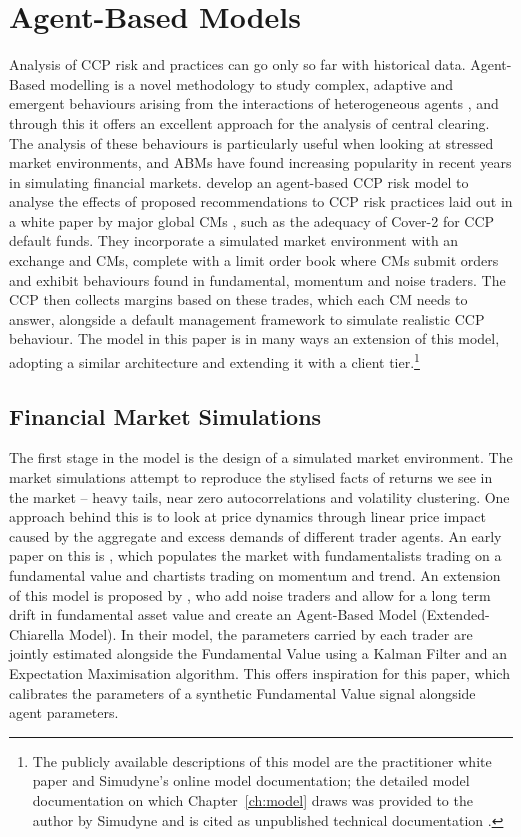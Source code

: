 \section{Agent-Based Models}

Analysis of CCP risk and practices can go only so far with historical data. Agent-Based modelling is a novel methodology to study complex, adaptive and emergent behaviours arising from the interactions of heterogeneous agents \citep{axtell_farmer_2025}, and through this it offers an excellent approach for the analysis of central clearing. The analysis of these behaviours is particularly useful when looking at stressed market environments, and ABMs have found increasing popularity in recent years in simulating financial markets. \cite{deloitte_ccp} develop an agent-based CCP risk model to analyse the effects of proposed recommendations to CCP risk practices laid out in a white paper by major global CMs \citep{ccp_path_forward_2020}, such as the adequacy of Cover-2 for CCP default funds. They incorporate a simulated market environment with an exchange and CMs, complete with a limit order book where CMs submit orders and exhibit behaviours found in fundamental, momentum and noise traders. The CCP then collects margins based on these trades, which each CM needs to answer, alongside a default management framework to simulate realistic CCP behaviour. The model in this paper is in many ways an extension of this model, adopting a similar architecture and extending it with a client tier.\footnote{The publicly available descriptions of this model are the
practitioner white paper \citep{deloitte_ccp} and Simudyne's online model
documentation; the detailed model documentation on which
Chapter~\ref{ch:model} draws was provided to the author by Simudyne and is cited as unpublished technical documentation \citep{simudyne_odd}.}

\subsection{Financial Market Simulations}

The first stage in the model is the design of a simulated market environment. The market simulations attempt to reproduce the stylised facts of returns we see in the market -- heavy tails, near zero autocorrelations and volatility clustering. One approach behind this is to look at price dynamics through linear price impact caused by the aggregate and excess demands of different trader agents. An early paper on this is \cite{chiarella_1992}, which populates the market with fundamentalists trading on a fundamental value and chartists trading on momentum and trend. An extension of this model is proposed by \cite{majewski_2018}, who add noise traders and allow for a long term drift in fundamental asset value and create an Agent-Based Model (Extended-Chiarella Model). In their model, the parameters carried by each trader are jointly estimated alongside the Fundamental Value using a Kalman Filter and an Expectation Maximisation algorithm. This offers inspiration for this paper, which calibrates the parameters of a synthetic Fundamental Value signal alongside agent parameters. 

